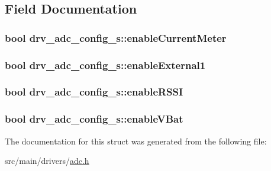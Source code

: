 \subsection{Field Documentation}
\hypertarget{structdrv__adc__config__s_a600480aceaa0b39d562f9f819d3d30d5}{
\subsubsection[{enable\+Current\+Meter}]{\setlength{\rightskip}{0pt plus 5cm}bool drv\+\_\+adc\+\_\+config\+\_\+s\+::enable\+Current\+Meter}}\label{structdrv__adc__config__s_a600480aceaa0b39d562f9f819d3d30d5}
\hypertarget{structdrv__adc__config__s_a2af61b86debe9eac8d06ec4b5e5cd38a}{
\subsubsection[{enable\+External1}]{\setlength{\rightskip}{0pt plus 5cm}bool drv\+\_\+adc\+\_\+config\+\_\+s\+::enable\+External1}}\label{structdrv__adc__config__s_a2af61b86debe9eac8d06ec4b5e5cd38a}
\hypertarget{structdrv__adc__config__s_a123f313124921d579dc5b5b74938e2aa}{
\subsubsection[{enable\+R\+S\+S\+I}]{\setlength{\rightskip}{0pt plus 5cm}bool drv\+\_\+adc\+\_\+config\+\_\+s\+::enable\+R\+S\+S\+I}}\label{structdrv__adc__config__s_a123f313124921d579dc5b5b74938e2aa}
\hypertarget{structdrv__adc__config__s_aa32839c2e87077e7928b0bfa4961d3f3}{
\subsubsection[{enable\+V\+Bat}]{\setlength{\rightskip}{0pt plus 5cm}bool drv\+\_\+adc\+\_\+config\+\_\+s\+::enable\+V\+Bat}}\label{structdrv__adc__config__s_aa32839c2e87077e7928b0bfa4961d3f3}


The documentation for this struct was generated from the following file\+:\begin{DoxyCompactItemize}
\item 
src/main/drivers/\hyperlink{adc_8h}{adc.\+h}\end{DoxyCompactItemize}
